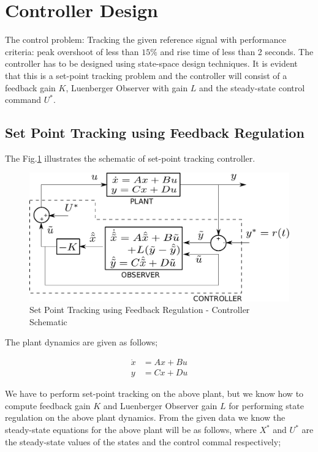 \documentclass[11pt,usenames]{article}
\begin{document}
\section{Controller Design}
The control problem: Tracking the given reference signal with performance criteria: peak overshoot of less than $15\%$ and rise time of less than 2 seconds. The controller has to be designed using state-space design techniques. It is evident that this is a set-point tracking problem and the controller will consist of a feedback gain $K$, Luenberger Observer with gain $L$ and the steady-state control command $U^{*}$.

\subsection{Set Point Tracking using Feedback Regulation}
The Fig.\ref{fig:SSController} illustrates the schematic of set-point tracking controller.
 
\begin{figure}[htpb]
	\centering
	\includegraphics[width=0.65\columnwidth]{SSController_Structure_Image.pdf}
	\caption{ Set Point Tracking using Feedback Regulation - Controller Schematic }
	\label{fig:SSController}
\end{figure}

The plant dynamics are given as follows;

\begin{align}
\dot{x}&=Ax+Bu \\
y&=Cx+Du
\end{align}

We have to perform set-point tracking on the above plant, but we know how to compute feedback gain $K$ and Luenberger Observer gain $L$ for performing state regulation on the above plant dynamics. From the given data we know the steady-state equations for the above plant will be as follows, where $X^{*}$ and $U^{*}$ are the steady-state values of the states and the control commal respectively;
\end{document}
